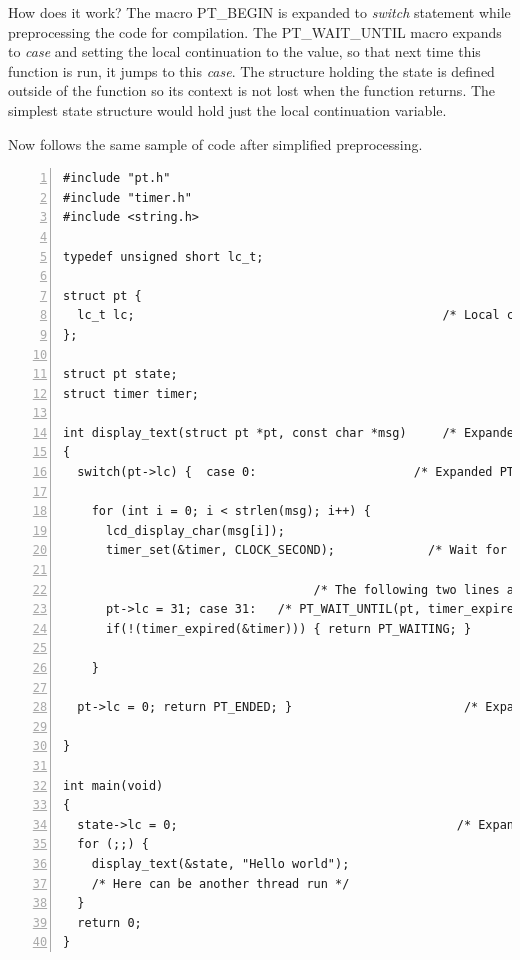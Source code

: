 How does it work? The macro PT\_BEGIN is expanded to {\it switch} statement while preprocessing the
code for compilation.
The PT\_WAIT\_UNTIL macro expands to {\it case} and setting the local continuation
to the value, so that next time this function is run, it jumps to this {\it case}.
The structure holding the state is defined outside of the function so its context is not lost when
the function returns. The simplest state structure would hold just the local continuation variable.

Now follows
the same sample of code after simplified preprocessing.
\begin{lstlisting}[numbers=left]
#include "pt.h"
#include "timer.h"
#include <string.h>

typedef unsigned short lc_t;

struct pt {
  lc_t lc;                                           /* Local continuation */
};

struct pt state;
struct timer timer;

int display_text(struct pt *pt, const char *msg)     /* Expanded PT_THREAD */
{
  switch(pt->lc) {  case 0:                      /* Expanded PT_BEGIN(pt); */

    for (int i = 0; i < strlen(msg); i++) {
      lcd_display_char(msg[i]);
      timer_set(&timer, CLOCK_SECOND);             /* Wait for one second. */

                                   /* The following two lines are expanded */
      pt->lc = 31; case 31:   /* PT_WAIT_UNTIL(pt, timer_expired(&timer)); */
      if(!(timer_expired(&timer))) { return PT_WAITING; }         /* macro */

    }

  pt->lc = 0; return PT_ENDED; }                        /* Expanded PT_END */

}

int main(void)
{
  state->lc = 0;                                       /* Expanded PT_INIT */
  for (;;) {
    display_text(&state, "Hello world");
    /* Here can be another thread run */
  }
  return 0;
}

\end{lstlisting}

